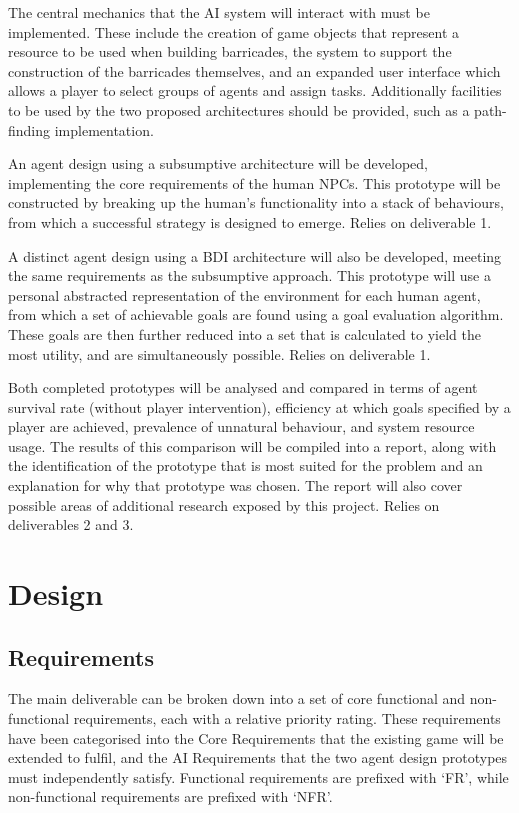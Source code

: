 \documentclass[12pt,a4paper]{article}
\begin{document}
\begin{enumerate}
  {The central mechanics that the AI system will interact with must be implemented. These include the creation of game objects that represent a resource to be used when building barricades, the system to support the construction of the barricades themselves, and an expanded user interface which allows a player to select groups of agents and assign tasks. Additionally facilities to be used by the two proposed architectures should be provided, such as a path-finding implementation.}

  {An agent design using a subsumptive architecture will be developed, implementing the core requirements of the human NPCs. This prototype will be constructed by breaking up the human's functionality into a stack of behaviours, from which a successful strategy is designed to emerge. Relies on deliverable 1.}

  {A distinct agent design using a BDI architecture will also be developed, meeting the same requirements as the subsumptive approach. This prototype will use a personal abstracted representation of the environment for each human agent, from which a set of achievable goals are found using a goal evaluation algorithm. These goals are then further reduced into a set that is calculated to yield the most utility, and are simultaneously possible. Relies on deliverable 1.}

  {Both completed prototypes will be analysed and compared in terms of agent survival rate (without player intervention), efficiency at which goals specified by a player are achieved, prevalence of unnatural behaviour, and system resource usage. The results of this comparison will be compiled into a report, along with the identification of the prototype that is most suited for the problem and an explanation for why that prototype was chosen. The report will also cover possible areas of additional research exposed by this project. Relies on deliverables 2 and 3.}
\end{enumerate}

\section{Design}
\subsection{Requirements}\noindent
The main deliverable can be broken down into a set of core functional and non-functional requirements, each with a relative priority rating. These requirements have been categorised into the Core Requirements that the existing game will be extended to fulfil, and the AI Requirements that the two agent design prototypes must independently satisfy. Functional requirements are prefixed with `FR', while non-functional requirements are prefixed with `NFR'.
\end{document}
